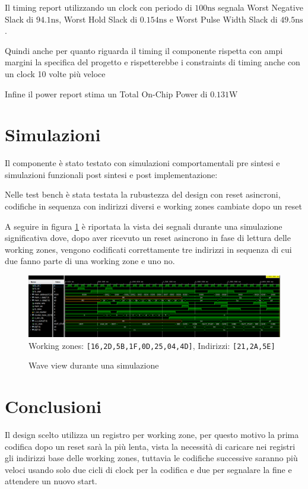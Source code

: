 \documentclass[a4paper]{article}
\begin{document}
Il timing report utilizzando un clock con periodo di $100\mathrm{ns}$ segnala Worst Negative Slack di $94.1\mathrm{ns}$, Worst Hold Slack di $0.154\mathrm{ns}$ e Worst Pulse Width Slack di $49.5\mathrm{ns}$.

Quindi anche per quanto riguarda il timing il componente rispetta con ampi margini la specifica del progetto e rispetterebbe i constraints di timing anche con un clock 10 volte più veloce

Infine il power report stima un Total On-Chip Power di $0.131\mathrm{W}$

\section{Simulazioni}

Il componente è stato testato con simulazioni comportamentali pre sintesi e simulazioni funzionali post sintesi e post implementazione:

Nelle test bench è stata testata la rubustezza del design con reset asincroni, codifiche in sequenza con indirizzi diversi e working zones cambiate dopo un reset

A seguire in figura \ref{fig:wave} è riportata la vista dei segnali durante una simulazione significativa dove, dopo aver ricevuto un reset asincrono in fase di lettura delle working zones, vengono codificati correttamente tre indirizzi in sequenza di cui due fanno parte di una working zone e uno no.

\begin{figure}[H]
  \centering
  \includegraphics[width=\linewidth]{waveview.png}
  {
    \small
    Working zones: \texttt{[16,2D,5B,1F,0D,25,04,4D]}, Indirizzi: \texttt{[21,2A,5E]}
  }
  \caption{Wave view durante una simulazione}
  \label{fig:wave}
\end{figure}

\section{Conclusioni}

Il design scelto utilizza un registro per working zone, per questo motivo la prima codifica dopo un reset sarà la più lenta, vista la necessità di caricare nei registri gli indirizzi base delle working zones, tuttavia le codifiche successive saranno più veloci usando solo due cicli di clock per la codifica e due per segnalare la fine e attendere un nuovo start.
\end{document}
